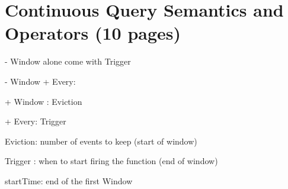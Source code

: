
\chapter{Continuous Query Semantics and Operators (10 pages)}

\ifpdf
    \graphicspath{{Chapter4/Figs/Raster/}{Chapter4/Figs/PDF/}{Chapter4/Figs/}}
\else
    \graphicspath{{Chapter4/Figs/Vector/}{Chapter4/Figs/}}
\fi


- Window alone come with Trigger

- Window + Every:

+ Window : Eviction

+ Every: Trigger 


Eviction: number of events to keep (start of window)

Trigger : when to start firing the function (end of window)


startTime: end of the first Window


